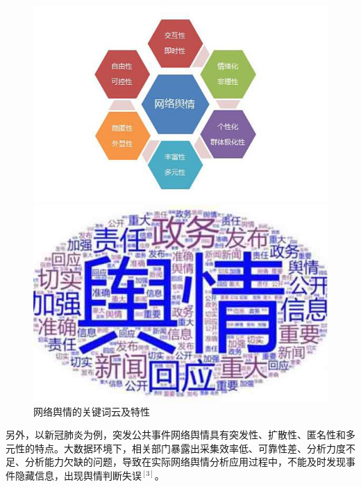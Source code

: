 \documentclass[11pt,a4paper,utf8]{article}
\begin{document}
\begin{figure}[H]
\centering 
\subfigure 
{  
    \begin{minipage}[b]{.4\linewidth}
        \centering
        \includegraphics[scale=0.45]{images/六边形.png}
     \end{minipage}
}
\subfigure 
{  
    \begin{minipage}[b]{.4\linewidth}
        \centering
        \includegraphics[scale=0.45]{images/词云图.png}
    \end{minipage}
     
}
\caption{网络舆情的关键词云及特性}
\end{figure}

另外，以新冠肺炎为例，突发公共事件网络舆情具有突发性、扩散性、匿名性和多元性的特点。大数据环境下，相关部门暴露出采集效率低、可靠性差、分析力度不足、分析能力欠缺的问题，导致在实际网络舆情分析应用过程中，不能及时发现事件隐藏信息，出现舆情判断失误$^{[3]}$。
\end{document}
